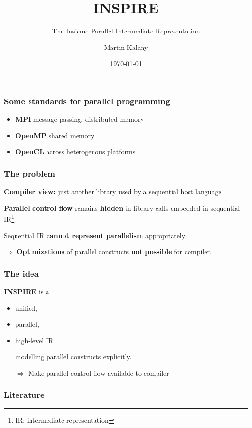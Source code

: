 \documentclass{beamer}
\title{INSPIRE}
\subtitle{The Insieme Parallel Intermediate Representation}
\author{Martin Kalany}
\institute
{
  Graduate student in Computer Science\\
  Vienna University of Technology\\
}
\date{\today}
\newcommand\fR[1]{\textcolor{red!80!black}{\textbf{#1}}}
\begin{document}
\maketitle

\begin{frame}
\frametitle{Some standards for parallel programming}
\begin{itemize}
\item \fR{MPI} message passing, distributed memory
\item \fR{OpenMP} shared memory
\item \fR{OpenCL} across heterogenous platforms
\end{itemize}
\end{frame}

\begin{frame}
\frametitle{The problem}

\fR{Compiler view:} just another library used by a sequential host language

\bigskip\pause
\fR{Parallel control flow} remains \fR{hidden} in library calls embedded in sequential IR\footnote{IR: intermediate representation }

\bigskip\pause
Sequential IR \fR{cannot represent parallelism} appropriately

\bigskip\pause
$\Rightarrow$ \fR{Optimizations} of parallel constructs \fR{not possible} for compiler. 
\end{frame}

\begin{frame}
\frametitle{The idea}
\fR{INSPIRE} is a
\begin{itemize}
\item unified,
\item parallel,
\item high-level IR

modelling parallel constructs explicitly.

\bigskip\pause
$\Rightarrow$ Make parallel control flow available to compiler
\end{itemize}

\end{frame}

\begin{frame}
\cite{JordanPTKF13}
\end{frame}

\begin{frame}[allowframebreaks]
\frametitle<presentation>{Literature}    
\printbibliography
\end{frame} 	 
\end{document}

